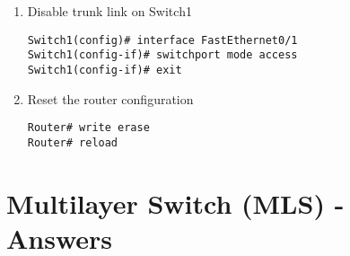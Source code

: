 \documentclass[a4paper]{book}
\begin{document}
\begin{enumerate}
\item{Disable trunk link on Switch1}

\begin{lstlisting}
Switch1(config)# interface FastEthernet0/1
Switch1(config-if)# switchport mode access
Switch1(config-if)# exit
\end{lstlisting}

\item{Reset the router configuration}

\begin{lstlisting}
Router# write erase
Router# reload
\end{lstlisting}

\end{enumerate}

\newpage

\chapter{Multilayer Switch (MLS) - Answers}
\end{document}
